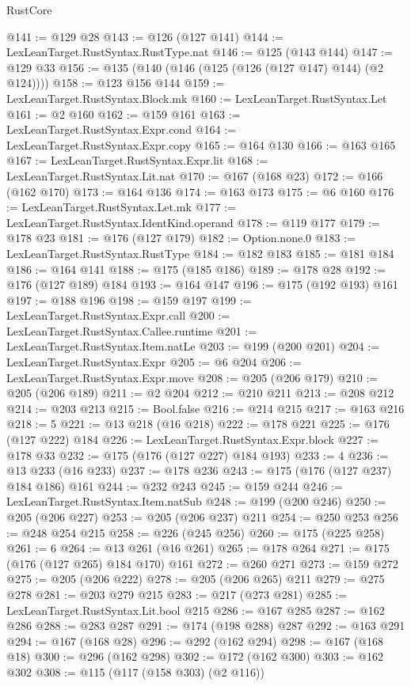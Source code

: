 \begin{lexlean}{RustCore}
\begin{coremodule}
@141 := @129 @28
@143 := @126 (@127 @141)
@144 := LexLeanTarget.RustSyntax.RustType.nat
@146 := @125 (@143 @144)
@147 := @129 @33
@156 := @135 (@140 (@146 (@125 (@126 (@127 @147) @144) (@2 @124))))
@158 := @123 @156 @144
@159 := LexLeanTarget.RustSyntax.Block.mk
@160 := LexLeanTarget.RustSyntax.Let
@161 := @2 @160
@162 := @159 @161
@163 := LexLeanTarget.RustSyntax.Expr.cond
@164 := LexLeanTarget.RustSyntax.Expr.copy
@165 := @164 @130
@166 := @163 @165
@167 := LexLeanTarget.RustSyntax.Expr.lit
@168 := LexLeanTarget.RustSyntax.Lit.nat
@170 := @167 (@168 @23)
@172 := @166 (@162 @170)
@173 := @164 @136
@174 := @163 @173
@175 := @6 @160
@176 := LexLeanTarget.RustSyntax.Let.mk
@177 := LexLeanTarget.RustSyntax.IdentKind.operand
@178 := @119 @177
@179 := @178 @23
@181 := @176 (@127 @179)
@182 := Option.none.{0}
@183 := LexLeanTarget.RustSyntax.RustType
@184 := @182 @183
@185 := @181 @184
@186 := @164 @141
@188 := @175 (@185 @186)
@189 := @178 @28
@192 := @176 (@127 @189) @184
@193 := @164 @147
@196 := @175 (@192 @193) @161
@197 := @188 @196
@198 := @159 @197
@199 := LexLeanTarget.RustSyntax.Expr.call
@200 := LexLeanTarget.RustSyntax.Callee.runtime
@201 := LexLeanTarget.RustSyntax.Item.natLe
@203 := @199 (@200 @201)
@204 := LexLeanTarget.RustSyntax.Expr
@205 := @6 @204
@206 := LexLeanTarget.RustSyntax.Expr.move
@208 := @205 (@206 @179)
@210 := @205 (@206 @189)
@211 := @2 @204
@212 := @210 @211
@213 := @208 @212
@214 := @203 @213
@215 := Bool.false
@216 := @214 @215
@217 := @163 @216
@218 := 5
@221 := @13 @218 (@16 @218)
@222 := @178 @221
@225 := @176 (@127 @222) @184
@226 := LexLeanTarget.RustSyntax.Expr.block
@227 := @178 @33
@232 := @175 (@176 (@127 @227) @184 @193)
@233 := 4
@236 := @13 @233 (@16 @233)
@237 := @178 @236
@243 := @175 (@176 (@127 @237) @184 @186) @161
@244 := @232 @243
@245 := @159 @244
@246 := LexLeanTarget.RustSyntax.Item.natSub
@248 := @199 (@200 @246)
@250 := @205 (@206 @227)
@253 := @205 (@206 @237) @211
@254 := @250 @253
@256 := @248 @254 @215
@258 := @226 (@245 @256)
@260 := @175 (@225 @258)
@261 := 6
@264 := @13 @261 (@16 @261)
@265 := @178 @264
@271 := @175 (@176 (@127 @265) @184 @170) @161
@272 := @260 @271
@273 := @159 @272
@275 := @205 (@206 @222)
@278 := @205 (@206 @265) @211
@279 := @275 @278
@281 := @203 @279 @215
@283 := @217 (@273 @281)
@285 := LexLeanTarget.RustSyntax.Lit.bool @215
@286 := @167 @285
@287 := @162 @286
@288 := @283 @287
@291 := @174 (@198 @288) @287
@292 := @163 @291
@294 := @167 (@168 @28)
@296 := @292 (@162 @294)
@298 := @167 (@168 @18)
@300 := @296 (@162 @298)
@302 := @172 (@162 @300)
@303 := @162 @302
@308 := @115 (@117 (@158 @303) (@2 @116))

\end{coremodule}
\end{lexlean}
